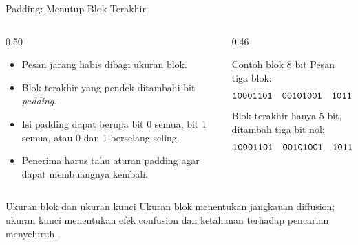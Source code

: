 \documentclass[aspectratio=169,11pt]{beamer}
\begin{document}
\begin{frame}{Padding: Menutup Blok Terakhir}
    \begin{columns}[T,onlytextwidth]
        \begin{column}{0.50\textwidth}
            \footnotesize
            \begin{itemize}
                \item Pesan jarang habis dibagi ukuran blok.
                \item Blok terakhir yang pendek ditambahi bit
                      \textit{padding}.
                \item Isi padding dapat berupa bit 0 semua, bit 1 semua,
                      atau 0 dan 1 berselang-seling.
                \item Penerima harus tahu aturan padding agar dapat
                      membuangnya kembali.
            \end{itemize}
        \end{column}
        \begin{column}{0.46\textwidth}
            \begin{exampleblock}{Contoh blok 8 bit}
                \footnotesize
                Pesan tiga blok:
                \[
                    \texttt{10001101}\quad \texttt{00101001}\quad
                    \texttt{10110}
                \]
                Blok terakhir hanya 5 bit, ditambah tiga bit nol:
                \[
                    \texttt{10001101}\quad \texttt{00101001}\quad
                    \texttt{10110000}
                \]
            \end{exampleblock}
        \end{column}
    \end{columns}
    \vspace{0.15cm}
    \begin{block}{Ukuran blok dan ukuran kunci}
        \footnotesize
        Ukuran blok menentukan jangkauan diffusion; ukuran kunci
        menentukan efek confusion dan ketahanan terhadap pencarian
        menyeluruh.
    \end{block}
\end{frame}
\end{document}
